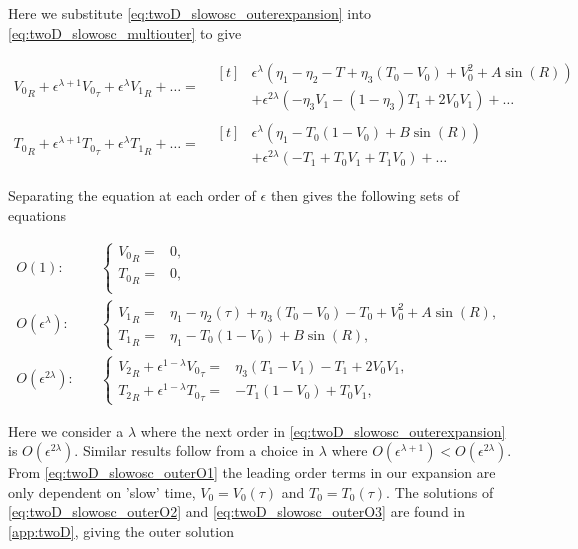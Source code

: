 Here we substitute \eqref{eq:twoD_slowosc_outerexpansion} into \eqref{eq:twoD_slowosc_multiouter} to give

\begin{equation*}
\begin{aligned}
{V_0}_R+\epsilon^{\lambda+1}{V_0}_\tau+\epsilon^\lambda {V_1}_R+\ldots=&\begin{aligned}[t]&
\epsilon^\lambda \left(\eta_1-\eta_2-T+\eta_3(T_0-V_0)+V_0^2+A\sin(R)\right)\\
&+\epsilon^{2\lambda}\left(-\eta_3 V_1-(1-\eta_3)T_1+2V_0V_1\right)+\ldots
\end{aligned}\\
{T_0}_R+\epsilon^{\lambda+1}{T_0}_\tau+\epsilon^\lambda {T_1}_R+\ldots=&\begin{aligned}[t]&
\epsilon^\lambda\left( \eta_1-T_0(1-V_0)+B\sin(R)\right)\\
&+\epsilon^{2\lambda}\left(-T_1+T_0V_1+T_1V_0\right)+\ldots
\end{aligned}
\end{aligned}
\end{equation*}

Separating the equation at each order of $\epsilon$ then gives the following sets of equations

\begin{align}
\label{eq:twoD_slowosc_outerO1}
O(1):\quad & \begin{cases}
	{V_0}_R =&  0, \\
	{T_0}_R =&  0,\\
\end{cases}\\
\label{eq:twoD_slowosc_outerO2}
O(\epsilon^\lambda):\quad & \begin{cases}
	{V_1}_R = & \eta_1-\eta_2(\tau) +\eta_3(T_0-V_0)-T_0+V_0^2+A\sin(R),\\
	{T_1}_R =&  \eta_1-T_0(1-V_0)+B\sin(R),
\end{cases}\\
\label{eq:twoD_slowosc_outerO3}
O(\epsilon^{2\lambda}):\quad & \begin{cases}
	{V_2}_R+\epsilon^{1-\lambda}{V_0}_\tau = & \eta_3(T_1-V_1)-T_1+2V_0V_1,\\
	{T_2}_R +\epsilon^{1-\lambda}{T_0}_\tau =&  -T_1(1-V_0)+T_0V_1,
\end{cases}
\end{align}

Here we consider a $\lambda$ where the next order in \eqref{eq:twoD_slowosc_outerexpansion} is $O(\epsilon^{2\lambda})$. Similar results follow from a choice in $\lambda$ where $O(\epsilon^{\lambda+1})<O(\epsilon^{2\lambda})$. From \eqref{eq:twoD_slowosc_outerO1} the leading order terms in our expansion are only dependent on 'slow' time, $V_0=V_0(\tau)$ and $T_0=T_0(\tau)$. The solutions of \eqref{eq:twoD_slowosc_outerO2} and \eqref{eq:twoD_slowosc_outerO3} are found in \autoref{app:twoD}, giving the outer solution 

